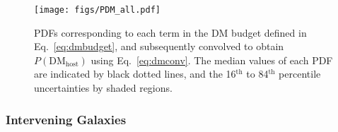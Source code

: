 \documentclass[twocolumn, linenumbers, tra]{aastex631}
\begin{document}
\begin{figure}
  \centering
  \hspace{-0.3cm}
  \texttt{[image: figs/PDM\_all.pdf]}
  \caption{PDFs corresponding to each term in the DM budget defined in Eq.~\ref{eq:dmbudget}, and subsequently convolved to obtain $P(\mathrm{DM}_{\mathrm{host}})$ using Eq.~\ref{eq:dmconv}. The median values of each PDF are indicated by black dotted lines, and the 16$^{\mathrm{th}}$ to 84$^{\mathrm{th}}$ percentile uncertainties by shaded regions.}
  \label{fig:dmigm}
\end{figure}

\subsubsection{Intervening Galaxies} \label{sec:ighdm}
\end{document}
